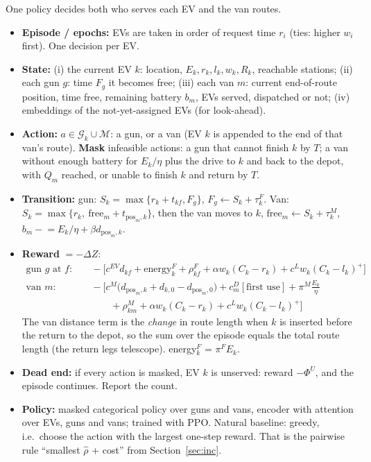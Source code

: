 \documentclass[11pt,a4paper]{article}
\newif\ifTOU \TOUfalse   %
\newcommand{\G}{\mathcal{G}}
\newcommand{\M}{\mathcal{M}}
\newcommand{\pk}{\mathrm{pk}}
\newcommand{\off}{\mathrm{off}}
\begin{document}
\else
One policy decides both who serves each EV and the van routes.
\begin{itemize}[leftmargin=1.4em,itemsep=2pt]
  \item \textbf{Episode / epochs:} EVs are taken in order of request time $r_i$ (ties: higher $w_i$ first). One decision per EV.
  \item \textbf{State:} (i) the current EV $k$: location, $E_k,r_k,l_k,w_k,R_k$, reachable stations; (ii) each gun $g$: time $F_g$ it becomes free; (iii) each van $m$: current end-of-route position, time free, remaining battery $b_m$, EVs served, dispatched or not; (iv) embeddings of the not-yet-assigned EVs (for look-ahead)\ifTOU; (v) current price, time until $T_1$ and $T_2$\fi.
  \item \textbf{Action:} $a\in\G_k\cup\M$: a gun, or a van (EV $k$ is appended to the end of that van's route). \textbf{Mask} infeasible actions: a gun that cannot finish $k$ by $T$; a van without enough battery for $E_k/\eta$ plus the drive to $k$ and back to the depot, with $Q_m$ reached, or unable to finish $k$ and return by $T$.
  \ifTOU\item \textbf{Optional timing action:} ``gun $g$, start after the peak'' ($S_k=\max\{\text{earliest},T_2\}$, if it still ends by $T$).\fi
  \item \textbf{Transition:} gun: $S_k=\max\{r_k+t_{kf},F_g\}$, $F_g\leftarrow S_k+\tau^F_k$. Van: $S_k=\max\{r_k,\ \text{free}_m+t_{\text{pos}_m,k}\}$, then the van moves to $k$, $\text{free}_m\leftarrow S_k+\tau^M_k$, $b_m\mathrel{-}=E_k/\eta+\beta d_{\text{pos}_m,k}$.
  \item \textbf{Reward} $=-\Delta Z$:
  \begin{align*}
  \text{gun } g\text{ at }f:&\quad -\Big[c^{EV}d_{kf}+\text{energy}^F_k+\rho^F_{kf}+\alpha w_k(C_k-r_k)+c^Lw_k(C_k-l_k)^+\Big]\\
  \text{van } m:&\quad -\Big[c^M\big(d_{\text{pos}_m,k}+d_{k,0}-d_{\text{pos}_m,0}\big)+c^D_m[\text{first use}]+\pi^M\tfrac{E_k}{\eta}\\
  &\qquad\quad+\rho^M_{km}+\alpha w_k(C_k-r_k)+c^Lw_k(C_k-l_k)^+\Big]
  \end{align*}
  The van distance term is the \emph{change} in route length when $k$ is inserted before the return to the depot, so the sum over the episode equals the total route length (the return legs telescope). energy$^F_k$ = \ifTOU$P^F\big[\pi^\off\cdot(\text{off-peak hours})+\pi^\pk\cdot(\text{peak hours of }[S_k,C_k])\big]$, computed exactly by the simulator; no linearisation is needed in RL\else$\pi^FE_k$\fi.
  \item \textbf{Dead end:} if every action is masked, EV $k$ is unserved: reward $-\Phi^U$, and the episode continues. Report the count.
  \item \textbf{Policy:} masked categorical policy over guns and vans, encoder with attention over EVs, guns and vans; trained with PPO. Natural baseline: greedy, i.e.\ choose the action with the largest one-step reward. That is the pairwise rule ``smallest $\hat\rho$ + cost'' from Section~\ref{sec:inc}.
\end{itemize}
\end{document}
